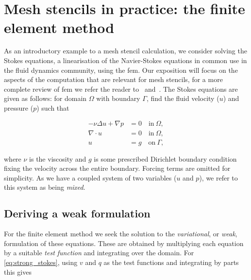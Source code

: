 \documentclass[thesis]{subfiles}
\begin{document}
\section{Mesh stencils in practice: the finite element method}
\label{sec:stokes_equations}

As an introductory example to a mesh stencil calculation, we consider solving the Stokes equations, a linearisation of the Navier-Stokes equations in common use in the fluid dynamics community, using the \gls{fem}.
Our exposition will focus on the aspects of the computation that are relevant for mesh stencils, for a more complete review of \gls{fem} we refer the reader to~\cite{brennerMathematicalTheoryFinite2008} and~\cite{larsonFiniteElementMethod2013}.
The Stokes equations are given as follows: for domain $\Omega$ with boundary $\Gamma$, find the fluid velocity ($u$) and pressure ($p$) such that

\begin{subequations}
  \begin{align}
    - \nu \Delta u + \nabla p &= 0 \quad \textrm{in} \ \Omega, \\
    \nabla \cdot u &= 0 \quad \textrm{in} \ \Omega, \\
    u &= g \quad \textrm{on} \ \Gamma,
  \end{align}
  \label{eq:strong_stokes}
\end{subequations}

where $\nu$ is the viscosity and $g$ is some prescribed Dirichlet boundary condition fixing the velocity across the entire boundary.
Forcing terms are omitted for simplicity.
As we have a coupled system of two variables ($u$ and $p$), we refer to this system as being \textit{mixed}.

\subsection{Deriving a weak formulation}


For the finite element method we seek the solution to the \textit{variational}, or \textit{weak}, formulation of these equations.
These are obtained by multiplying each equation by a suitable \textit{test function} and integrating over the domain.
For \cref{eq:strong_stokes}, using $v$ and $q$ as the test functions and integrating by parts this gives
\end{document}
